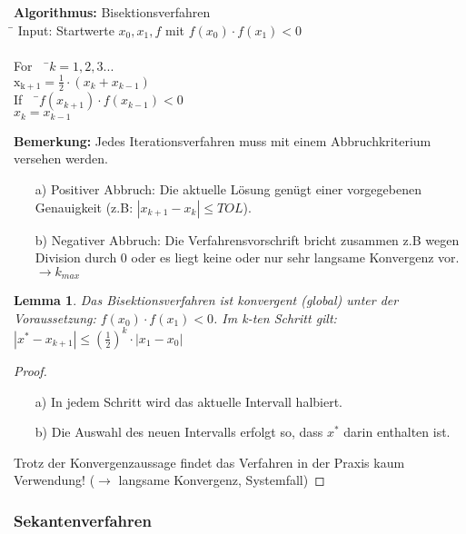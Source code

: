 \documentclass[10pt,a4paper]{article}
\newtheorem{lemma}{Lemma}[section]
\theoremstyle{definition} \newtheorem{definition}{Definition}[section]
\theoremstyle{bemerkung}    \newtheorem{bemerkung}{Bemerkung}[]
\begin{document}
\begin{tabbing}
\textbf{Algorithmus:} Bisektionsverfahren\\
\= \kill
Input: Startwerte $x_0, x_1, f$ mit $f(x_0) \cdot f(x_1) <0$\\
\newline
\\\> For \ \ \=$k=1,2,3...$\\ 
\> \> $\mathrm{x_{k+1}}= \frac{1}{2} \cdot (x_k + x_{k-1})$ \\
\> \> If \ \ \=$f(x_{k+1})\cdot f(x_{k-1})<0$\\
\> \> \> $x_k=x_{k-1}$ \\
\end{tabbing}

\textbf{Bemerkung:}
Jedes Iterationsverfahren muss mit einem Abbruchkriterium versehen werden.

\begin{enumerate}
\item[a)] Positiver Abbruch: Die aktuelle Lösung genügt einer vorgegebenen Genauigkeit
      (z.B: $|x_{k+1}-x_k|\leq TOL$).
\item[b)] Negativer Abbruch: Die Verfahrensvorschrift bricht zusammen z.B wegen Division durch 0
      oder es liegt keine oder nur sehr langsame Konvergenz vor. $\rightarrow k_{max}$
\end{enumerate}

\begin{lemma}
Das Bisektionsverfahren ist konvergent (global) unter der Voraussetzung:
$f(x_0) \cdot f(x_1) <0$. Im k-ten Schritt gilt: $|x^*-x_{k+1}|\leq
(\frac{1}{2})^k \cdot |x_1-x_0|$ 
\end{lemma}

\begin{proof}
~
\begin{enumerate}
\item[a)] In jedem Schritt wird das aktuelle Intervall halbiert. 
\item[b)] Die Auswahl des neuen Intervalls erfolgt so, dass $x^*$ darin enthalten ist.
\end{enumerate}
Trotz der Konvergenzaussage findet das Verfahren in der Praxis kaum Verwendung! ($\rightarrow$ langsame Konvergenz, Systemfall)
\end{proof}

\subsubsection{Sekantenverfahren}
\end{document}
